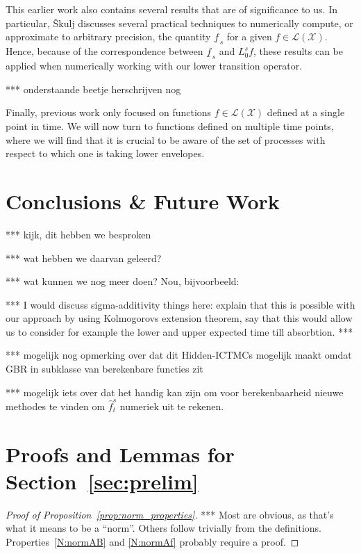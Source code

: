 \documentclass[10pt]{paper}
\theoremstyle{definition}
\newcommand{\states}{\mathcal{X}}
\newcommand{\gambles}{\mathcal{L}}
\newcommand{\gamblesX}{\gambles(\states)}
\begin{document}
This earlier work also contains several results that are of significance to us. In particular, {\v{S}}kulj discusses several practical techniques to numerically compute, or approximate to arbitrary precision, the quantity $\underline{f}_{\,s}$ for a given $f\in\gamblesX$. Hence, because of the correspondence between $\underline{f}_{\,s}$ and $L_0^sf$, these results can be applied when numerically working with our lower transition operator.

*** onderstaande beetje herschrijven nog

Finally, previous work only focused on functions $f\in\gamblesX$ defined at a single point in time. We will now turn to functions defined on multiple time points, where we will find that it is crucial to be aware of the set of processes with respect to which one is taking lower envelopes.

\section{Conclusions \& Future Work}\label{sec:conclusions}

*** kijk, dit hebben we besproken

*** wat hebben we daarvan geleerd?

*** wat kunnen we nog meer doen? Nou, bijvoorbeeld:

*** I would discuss sigma-additivity things here: explain that this is possible with our approach by using Kolmogorovs extension theorem, say that this would allow us to consider for example the lower and upper expected time till absorbtion. ***

*** mogelijk nog opmerking over dat dit Hidden-ICTMCs mogelijk maakt omdat GBR in subklasse van berekenbare functies zit

*** mogelijk iets over dat het handig kan zijn om voor berekenbaarheid nieuwe methodes te vinden om $\hat{f}_t^s$ numeriek uit te rekenen.


 


\appendix

\section{Proofs and Lemmas for Section~\ref{sec:prelim}}

\begin{proof}[Proof of Proposition~\ref{prop:norm_properties}]
*** Most are obvious, as that's what it means to be a ``norm''. Others follow trivially from the definitions. Properties~\ref{N:normAB} and \ref{N:normAf} probably require a proof.
\end{proof}
\end{document}
